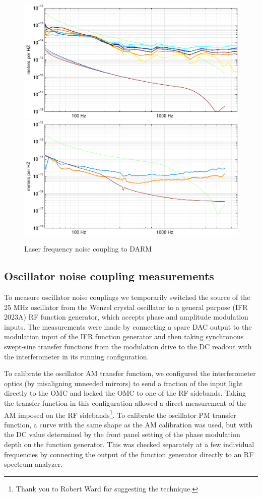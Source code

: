 \begin{figure}
\includegraphics[]{figures/laserFM-L1.pdf}
\includegraphics[]{figures/laserFM-H1.pdf}
\caption[Laser frequency noise coupling (measured and modeled)]{Laser frequency noise coupling to DARM}
\end{figure}

\subsection{Oscillator noise coupling measurements}

To measure oscillator noise couplings we temporarily switched the
source of the 25 MHz oscillator from the Wenzel crystal oscillator to
a general purpose (IFR 2023A) RF function generator, which accepts
phase and amplitude modulation inputs.  The measurements were made by
connecting a spare DAC output to the modulation input of the IFR
function generator and then taking synchronous swept-sine transfer
functions from the modulation drive to the DC readout with the
interferometer in its running configuration.

To calibrate the oscillator AM transfer function, we configured the
interferometer optics (by misaligning unneeded mirrors) to send a
fraction of the input light directly to the OMC and locked the OMC to
one of the RF sidebands.  Taking the transfer function in this
configuration allowed a direct measurement of the AM imposed on the RF
sidebands\footnote{Thank you to Robert Ward for suggesting the
  technique.}.  To calibrate the oscillator PM transfer function, a
curve with the same shape as the AM calibration was used, but with the
DC value determined by the front panel setting of the phase modulation
depth on the function generator.  This was checked separately at a few
individual frequencies by connecting the output of the function
generator directly to an RF spectrum analyzer.

